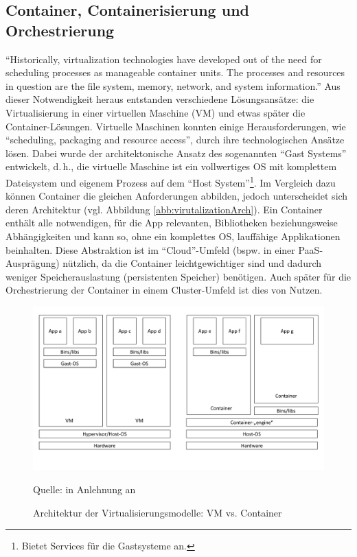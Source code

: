 \subsection{Container, Containerisierung und Orchestrierung}\label{kap:container}
\enquote{Historically, virtualization technologies have developed out of the need for scheduling processes as manageable container units. The processes and resources in question are the file system, memory, network, and system information.}\autocite[][S.\,25]{pahl_containerization_2015} Aus dieser Notwendigkeit heraus entstanden verschiedene Lösungsansätze: die Virtualisierung in einer virtuellen Maschine (\ac{VM}) und etwas später die Container-Lösungen. Virtuelle Maschinen konnten einige Herausforderungen, wie \enquote{scheduling, packaging and resource access}, durch ihre technologischen Ansätze lösen. Dabei wurde der architektonische Ansatz des sogenannten \enquote{Gast Systems} entwickelt, d.\,h., die virtuelle Maschine ist ein vollwertiges \ac{OS} mit komplettem Dateisystem und eigenem Prozess auf dem \enquote{Host System}\footnote{Bietet Services für die Gastsysteme an.}. Im Vergleich dazu können Container die gleichen Anforderungen abbilden, jedoch unterscheidet sich deren Architektur (vgl. Abbildung \vref{abb:virutalizationArch}). Ein Container enthält alle notwendigen, für die App relevanten, Bibliotheken beziehungsweise Abhängigkeiten und kann so, ohne ein komplettes \ac{OS}, lauffähige Applikationen beinhalten. Diese Abstraktion ist im \enquote{Cloud}-Umfeld (bspw. in einer \ac{PaaS}-Ausprägung) nützlich, da die Container leichtgewichtiger sind und dadurch weniger Speicherauslastung (persistenten Speicher) benötigen. Auch später für die Orchestrierung der Container in einem Cluster-Umfeld ist dies von Nutzen. 

\begin{figure}[h!]
	\centering
	\includegraphics[scale=0.44]{img/virtualization architecture.pdf}
	\caption{Architektur der Virtualisierungsmodelle: VM vs. Container}
	{\footnotesize Quelle: in Anlehnung an \cite{pahl_containerization_2015}}
	\label{abb:virutalizationArch}
\end{figure}


